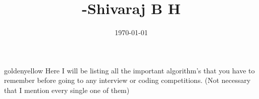 \documentclass[12pt]{article}
\begin{document}
	\title{
		\fontsize{16}{24}\bfseries
	-Shivaraj B H
	}
	\date{\today}
	\maketitle



	
	\begin{mybox}{goldenyellow}{}		
		Here I will be listing all the important algorithm's that you have to remember before going to any interview or coding competitions. (Not necessary that I mention every single one of them)
	\end{mybox}


			
			
\end{document}
